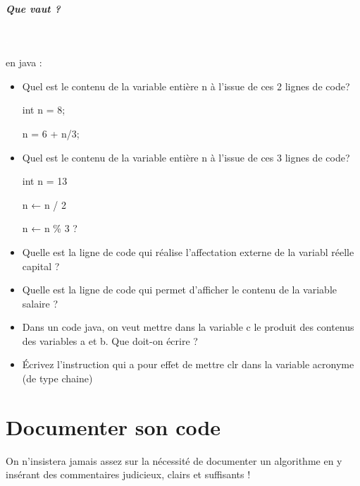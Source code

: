 \documentclass[11pt,a4paper]{article}
\begin{document}
			
		\subparagraph{Que vaut ?} 
		
                \textcolor{white}{.} \par
            
							  en java :
							
					\begin{itemize}
				
			\item Quel est le contenu de la variable enti\`ere n \`a l'issue de ces 2 lignes de code?\par
				
                    int n = 8;\par
				
                    n = 6 + n/3;\par
				 \textcolor{gray}{\underline{\hspace*{1em}}} 
			\item Quel est le contenu de la variable enti\`ere n \`a l'issue de ces 3 lignes de code?\par
				
                    int n = 13\par
				
                    n ← n / 2\par
				
                    n ← n \% 3 ? \par
				 \textcolor{gray}{\underline{\hspace*{1em}}} 
			\item Quelle est la ligne de code qui r\'ealise l'affectation externe de la variabl r\'eelle capital ?  \textcolor{gray}{\underline{\hspace*{16em}}} 
			\item Quelle est la ligne de code qui permet d'afficher le contenu de la variable salaire ?  \textcolor{gray}{\underline{\hspace*{16em}}} 
			\item Dans un code java, on veut mettre dans la variable c le produit des contenus des
									  variables a et b. Que doit-on \'ecrire ?  \textcolor{gray}{\underline{\hspace*{10em}}} 
			\item \'Ecrivez l'instruction qui a pour effet de mettre clr dans la variable acronyme (de type chaine)  \textcolor{gray}{\underline{\hspace*{16em}}} 
					\end{itemize}
				\section{Documenter son code}
				On n'insistera jamais assez sur la n\'ecessit\'e de documenter un algorithme en y ins\'erant 
        des commentaires judicieux, clairs et suffisants !
      
\end{document}
